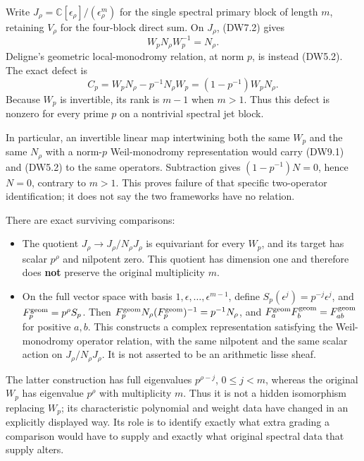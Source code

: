 Write \(J_\rho=\mathbb C[\epsilon_\rho]/(\epsilon_\rho^m)\) for the
single spectral primary block of length \(m\), retaining \(V_\rho\) for
the four-block direct sum. On \(J_\rho\), (DW7.2) gives \[
W_pN_\rho W_p^{-1}=N_\rho.
\tag{DW9.1}
\] Deligne's geometric local-monodromy relation, at norm \(p\), is
instead (DW5.2). The exact defect is \[
C_p=W_pN_\rho-p^{-1}N_\rho W_p
=(1-p^{-1})W_pN_\rho.
\tag{DW9.2}
\] Because \(W_p\) is invertible, its rank is \(m-1\) when \(m>1\). Thus
this defect is nonzero for every prime \(p\) on a nontrivial spectral
jet block.

In particular, an invertible linear map intertwining both the same
\(W_p\) and the same \(N_\rho\) with a norm-\(p\) Weil-monodromy
representation would carry (DW9.1) and (DW5.2) to the same operators.
Subtraction gives \((1-p^{-1})N=0\), hence \(N=0\), contrary to \(m>1\).
This proves failure of that specific two-operator identification; it
does not say the two frameworks have no relation.

There are exact surviving comparisons:

\begin{itemize}
\tightlist
\item
  The quotient \(J_\rho\to J_\rho/N_\rho J_\rho\) is equivariant for
  every \(W_p\), and its target has scalar \(p^\rho\) and nilpotent
  zero. This quotient has dimension one and therefore does \textbf{not}
  preserve the original multiplicity \(m\).
\item
  On the full vector space with basis
  \(1,\epsilon,\ldots,\epsilon^{m-1}\), define
  \(S_p(\epsilon^j)=p^{-j}\epsilon^j\), and
  \(F_p^{\rm geom}=p^\rho S_p\). Then
  \(F_p^{\rm geom}N_\rho(F_p^{\rm geom})^{-1}=p^{-1}N_\rho\), and
  \(F_a^{\rm geom}F_b^{\rm geom}=F_{ab}^{\rm geom}\) for positive
  \(a,b\). This constructs a complex representation satisfying the
  Weil-monodromy operator relation, with the same nilpotent and the same
  scalar action on \(J_\rho/N_\rho J_\rho\). It is not asserted to be an
  arithmetic lisse sheaf.
\end{itemize}

The latter construction has full eigenvalues \(p^{\rho-j}\),
\(0\le j<m\), whereas the original \(W_p\) has eigenvalue \(p^\rho\)
with multiplicity \(m\). Thus it is not a hidden isomorphism replacing
\(W_p\); its characteristic polynomial and weight data have changed in
an explicitly displayed way. Its role is to identify exactly what extra
grading a comparison would have to supply and exactly what original
spectral data that supply alters.


